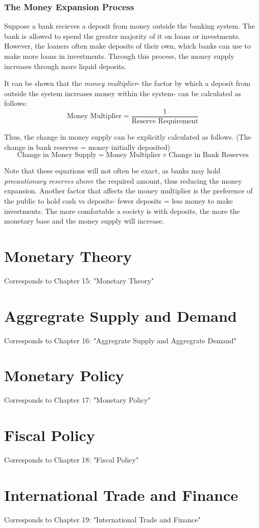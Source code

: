 \documentclass[12pt, a4paper]{article}
\theoremstyle{definition}
\begin{document}
\subsubsection{The Money Expansion Process}
Suppose a bank recieves a deposit from money outside the banking system.
The bank is allowed to spend the greater majority of it on loans or investments.
However, the loaners often make deposits of their own, which banks can use to make more loans in investments.
Through this process, the money supply increases through more liquid deposits.

It can be shown that the \textit{money multiplier}- the factor by which a deposit from outside the system increases money within the system- can be calculated as follows:
\[\textrm{Money Multiplier} = \frac{1}{\textrm{Reserve Requirement}}\]

Thus, the change in money supply can be explicitly calculated as follows.
(The change in bank reserves = money initially deposited)
\[\textrm{Change in Money Supply} = \textrm{Money Multiplier} \times \textrm{Change in Bank Reserves}\]

Note that these equations will not often be exact, as banks may hold \textit{precautionary reserves} above the required amount, thus reducing the money expansion.
Another factor that affects the money multiplier is the preference of the public to hold cash vs deposits- fewer deposits = less money to make investments.
The more comfortable a society is with deposits, the more the monetary base and the money supply will increase.


\newpage

\section{Monetary Theory}
Corresponds to Chapter 15: "Monetary Theory"

\newpage

\section{Aggregrate Supply and Demand}
Corresponds to Chapter 16: "Aggregrate Supply and Aggregrate Demand"

\newpage

\section{Monetary Policy}
Corresponds to Chapter 17: "Monetary Policy"

\newpage

\section{Fiscal Policy}
Corresponds to Chapter 18: "Fiscal Policy"

\newpage

\section{International Trade and Finance}
Corresponds to Chapter 19: "International Trade and Finance"

\newpage
\end{document}
